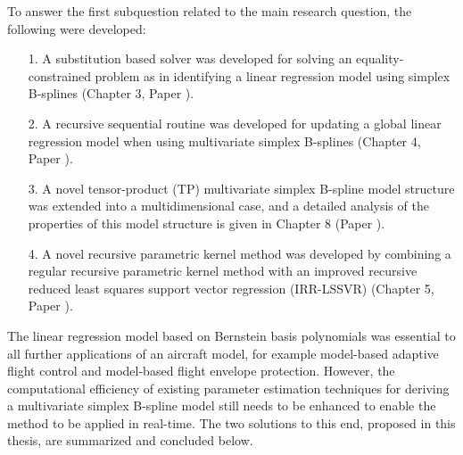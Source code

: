 \vspace{-0.5cm}
\begin{shaded}
\end{shaded}
\vspace{-0.8718033cm}
\begin{shaded}
\end{shaded}

To answer the first subquestion related to the main research question, the following were developed:\\
\vspace{-0.4cm}
\begin{enumerate}
\item[1.] A substitution based solver was developed for solving an equality-constrained problem as in identifying a linear regression model using simplex B-splines (Chapter 3, Paper \cite{liguoeurognc13,hjtol14j}). 
\item[2.] A recursive sequential routine was developed for updating a global linear regression model when using multivariate simplex B-splines (Chapter 4, Paper \cite{lgsunjRS2013}).
\item[3.] A novel tensor-product (TP) multivariate simplex B-spline model structure was extended into a multidimensional case, and a detailed analysis of the properties of this model structure is given in Chapter 8 (Paper \cite{liguosun2014c}).
\item[4.] A novel recursive parametric kernel method was developed by combining a regular recursive parametric kernel method with an improved recursive reduced least squares support vector regression (IRR-LSSVR) (Chapter 5, Paper \cite{sunlg13neuroj}).
\end{enumerate}

The linear regression model based on Bernstein basis polynomials was essential to all further applications of an aircraft model, for example model-based adaptive flight control and model-based flight envelope protection. However, the computational efficiency of existing parameter estimation techniques for deriving a multivariate simplex B-spline model still needs to be enhanced to enable the method to be applied in real-time. The two solutions to this end, proposed in this thesis, are summarized and concluded below.\\

